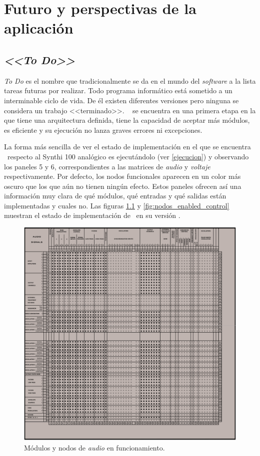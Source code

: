 \singlespacing
\chapter[Futuro de la aplicación]{Futuro y perspectivas de la aplicación}
\onehalfspacing


\section{\textit{<<To Do>>}}

\textit{To Do} es el nombre que tradicionalmente se da en el mundo del \textit{software} a la lista tareas futuras por realizar. Todo programa informático está sometido a un interminable ciclo de vida. De él existen diferentes versiones pero ninguna se considera un trabajo <<terminado>>. \appName~ se encuentra en una primera etapa en la que tiene una arquitectura definida, tiene la capacidad de aceptar más módulos, es eficiente y su ejecución no lanza graves errores ni excepciones.

La forma más sencilla de ver el estado de implementación en el que se encuentra \appName~respecto al Synthi 100 analógico es ejecutándolo (ver \ref{ejecucion}) y observando los paneles 5 y 6, correspondientes a las matrices de \textit{audio} y \textit{voltaje} respectivamente. Por defecto, los nodos funcionales aparecen en un color más oscuro que los que aún no tienen ningún efecto. Estos paneles ofrecen así una información muy clara de qué módulos, qué entradas y qué salidas están implementadas y cuales no. Las figuras \ref{fig:nodos_enabled_audio} y \ref{fig:nodos_enabled_control} muestran el estado de implementación de \appName~en su versión \version.


\begin{figure}
	\centering
	\includegraphics[width=1\textwidth]{nodos_enabled_audio}
	\caption[Módulos y nodos de \textit{audio} en funcionamiento]{Módulos y nodos de \textit{audio} en funcionamiento.}
	\label{fig:nodos_enabled_audio}
\end{figure}

